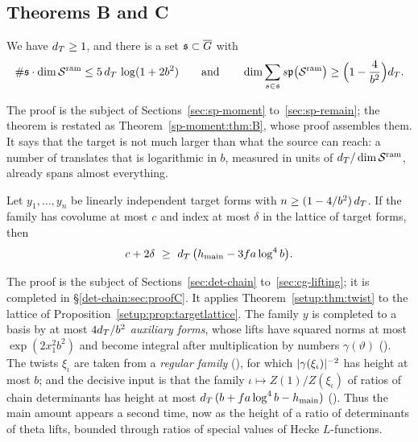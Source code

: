 \subsection{Theorems B and C}

\begin{theorem}\label{main:thm:B}
We have $d_T \ge 1$, and there is a set $\mathfrak{s} \subset \overline{G}$ with
\[
  \#\mathfrak{s}\cdot\dim\mathcal{S}^{\mathrm{ram}} \le 5\,d_T\,\log(1 + 2b^2)
  \qquad\text{and}\qquad
  \dim \sum_{s\in \mathfrak{s}} s\mathfrak{p}\bigl(\mathcal{S}^{\mathrm{ram}}\bigr) \ge \Bigl(1 - \frac{4}{b^2}\Bigr)d_T .
\]
\end{theorem}

The proof is the subject of Sections~\ref{sec:sp-moment} to~\ref{sec:sp-remain}; the theorem is
restated as Theorem~\ref{sp-moment:thm:B}, whose proof assembles them. It says that the
target is not much larger than what the source can reach: a number of translates that is
logarithmic in $b$, measured in units of $d_T/\dim\mathcal{S}^{\mathrm{ram}}$, already spans
almost everything.

\begin{theorem}\label{main:thm:C}
Let $y_1, \dots, y_n$ be linearly independent target forms with $n \ge (1 - 4/b^2)\,d_T$. If the
family has covolume at most $c$ and index at most $\delta$ in the lattice of target forms, then
\[
  c + 2\delta \ \ge\ d_T\,\bigl( h_{\mathrm{main}} - 3 f a\log^4 b \bigr).
\]
\end{theorem}

The proof is the subject of Sections~\ref{sec:det-chain} to~\ref{sec:cg-lifting}; it is completed
in \S\ref{det-chain:sec:proofC}. It applies
Theorem~\ref{setup:thm:twist} to the lattice of Proposition~\ref{setup:prop:targetlattice}. The
family $y$ is completed to a basis by at most $4d_T/b^2$ \emph{auxiliary forms}, whose lifts have
squared norms at most $\exp(2x_1^2b^2)$ and become integral after multiplication by numbers
$\gamma(\vartheta)$ (). The twists $\xi_\iota$
are taken from a \emph{regular family} (), for which
$\lvert\gamma(\xi_\iota)\rvert^{-2}$ has height at most $b$; and the decisive input is that the family
$\iota \mapsto Z(1)/Z(\xi_\iota)$ of ratios of chain determinants has height at most
$d_T\,(b + f a\log^4 b - h_{\mathrm{main}})$ (). Thus the main amount appears a second time,
now as the height of a ratio of determinants of theta lifts, bounded through ratios of special
values of Hecke $L$-functions.

